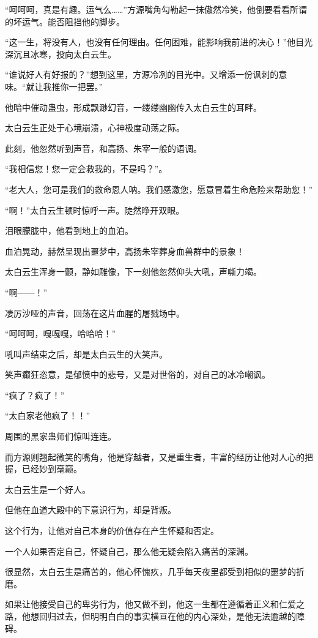 \begin{this_body}
“呵呵呵，真是有趣。运气么……”方源嘴角勾勒起一抹傲然冷笑，他倒要看看所谓的坏运气。能否阻挡他的脚步。

“这一生，将没有人，也没有任何理由。任何困难，能影响我前进的决心！”他目光深沉且冰寒，投向太白云生。

“谁说好人有好报的？”想到这里，方源冷冽的目光中。又增添一份讽刺的意味。“就让我推你一把罢。”

他暗中催动蛊虫，形成飘渺幻音，一缕缕幽幽传入太白云生的耳畔。

太白云生正处于心境崩溃，心神极度动荡之际。

此刻，他忽然听到声音，和高扬、朱宰一般的语调。

“我相信您！您一定会救我的，不是吗？”。

“老大人，您可是我们的救命恩人呐。我们感激您，愿意冒着生命危险来帮助您！”

“啊！”太白云生顿时惊呼一声。陡然睁开双眼。

泪眼朦胧中，他看到地上的血泊。

血泊晃动，赫然呈现出噩梦中，高扬朱宰葬身血兽群中的景象！

太白云生浑身一颤，静如雕像，下一刻他忽然仰头大吼，声嘶力竭。

“啊——！”

凄厉沙哑的声音，回荡在这片血腥的屠戮场中。

“呵呵呵，嘎嘎嘎，哈哈哈！”

吼叫声结束之后，却是太白云生的大笑声。

笑声癫狂恣意，是郁愤中的悲号，又是对世俗的，对自己的冰冷嘲讽。

“疯了？疯了！”

“太白家老他疯了！！”

周围的黑家蛊师们惊叫连连。

而方源则翘起微笑的嘴角，他是穿越者，又是重生者，丰富的经历让他对人心的把握，已经妙到毫巅。

太白云生是一个好人。

但他在血道大殿中的下意识行为，却是背叛。

这个行为，让他对自己本身的价值存在产生怀疑和否定。

一个人如果否定自己，怀疑自己，那么他无疑会陷入痛苦的深渊。

很显然，太白云生是痛苦的，他心怀愧疚，几乎每天夜里都受到相似的噩梦的折磨。

如果让他接受自己的卑劣行为，他又做不到，他这一生都在遵循着正义和仁爱之路，他想回归过去，但明明白白的事实横亘在他的内心深处，是他无法逾越的障碍。


\end{this_body}
